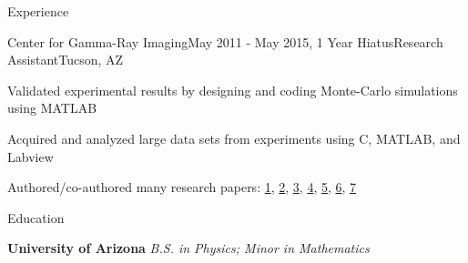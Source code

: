 \documentclass{resume} %
\begin{document}
\begin{rSection}{\vspace{-1em}Experience}
	\begin{rSubsection}{Center for Gamma-Ray Imaging}{May 2011 - May 2015, 1 Year Hiatus}{Research Assistant}{Tucson, AZ}
		\item Validated experimental results by designing and coding Monte-Carlo simulations using MATLAB
		\item Acquired and analyzed large data sets from experiments using C, MATLAB, and Labview
		\item Authored/co-authored many research papers: 
			\href{https://www.spiedigitallibrary.org/conference-proceedings-of-spie/9215/92150F/Imaging-properties-of-pixellated-scintillators-with-deep-pixels/10.1117/12.2066172.short}{1},
			\href{https://www.sciencedirect.com/science/article/abs/pii/S0168900215008384}{2},
			\href{https://www.spiedigitallibrary.org/conference-proceedings-of-spie/9211/921105/Testing-of-a-gamma-ray-imaging-system-at-the-High/10.1117/12.2066254.short}{3},
			\href{https://www.spiedigitallibrary.org/conference-proceedings-of-spie/8854/88540J/Preliminary-investigation-fo-the-non-linear-response-of-image-intensifiers/10.1117/12.2030175.short}{4},
			\href{https://ieeexplore.ieee.org/abstract/document/7581943}{5},
			\href{https://www.spiedigitallibrary.org/conference-proceedings-of-spie/9595/959504/Negative-temporal-cross-covariance-in-SrI2Eu/10.1117/12.2214406.short}{6},
			\href{https://www.spiedigitallibrary.org/conference-proceedings-of-spie/8854/88540F/Testing-of-a-gamma-ray-imaging-system-at-Omega/10.1117/12.2024400.short}{7}

	\end{rSubsection}

\end{rSection}


\begin{rSection}{Education}
	
	{\bf University of Arizona} {\em B.S. in Physics; Minor in Mathematics} \\ 
	\nolinebreak	
	
\end{rSection}

\end{document}
